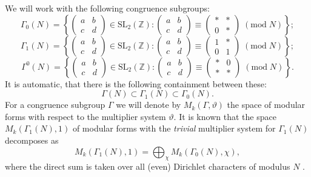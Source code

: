 \documentclass[11pt,a4paper]{amsart}
\theoremstyle{definition}
\newcommand{\SZ}{\mathbb{Z}}                    %
\begin{document}
We will work with the following congruence subgroups:
\[  \Gamma_0(N) = \left\{ \begin{pmatrix} a & b \\ c & d \end{pmatrix} \in \mathrm{SL_2}(\SZ) : \begin{pmatrix} a & b \\ c & d \end{pmatrix} \equiv \begin{pmatrix} \ast & \ast \\ 0 & \ast \end{pmatrix} \;(\mathrm{mod}\;N) \right\}; \]
\[  \Gamma_1(N) = \left\{ \begin{pmatrix} a & b \\ c & d \end{pmatrix} \in \mathrm{SL_2}(\SZ) : \begin{pmatrix} a & b \\ c & d \end{pmatrix} \equiv \begin{pmatrix} 1 & \ast \\ 0 & 1 \end{pmatrix} \;(\mathrm{mod}\;N) \right\}; \]
\[  \Gamma^0(N) = \left\{ \begin{pmatrix} a & b \\ c & d \end{pmatrix} \in \mathrm{SL_2}(\SZ) : \begin{pmatrix} a & b \\ c & d \end{pmatrix} \equiv \begin{pmatrix} \ast & 0 \\ \ast & \ast \end{pmatrix} \;(\mathrm{mod}\;N) \right\}. \]
It is automatic, that there is the following containment between these:
\[ \Gamma(N) \subset \Gamma_1(N) \subset \Gamma_0(N). \]
For a congruence subgroup $\Gamma$ we will denote by $ M_k(\Gamma, \vartheta)$ the space of modular forms with respect to the multiplier system $\vartheta$. It is known that the space $M_k(\Gamma_1(N), 1)$ of modular forms with the \emph{trivial} multiplier system for $\Gamma_1(N)$ decomposes as
\[ M_k(\Gamma_1(N), 1)= \bigoplus_{\chi} M_k(\Gamma_0(N), \chi), \]
where the direct sum is taken over all (even) Dirichlet characters of modulus $N$ \cite{serre1977modular}.


\end{document}
